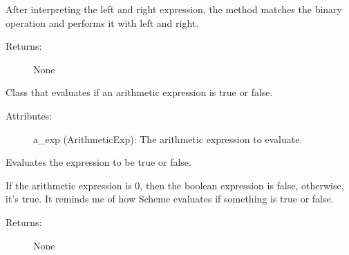 \documentclass[letterpaper,10pt,english]{sphinxmanual}
\begin{document}
\begin{fulllineitems}
\begin{fulllineitems}
\sphinxAtStartPar
After interpreting the left and right expression, the method matches
the binary operation and performs it with left and right.
\begin{description}
\item[{Returns:}] \leavevmode
\sphinxAtStartPar
None

\end{description}

\end{fulllineitems}


\end{fulllineitems}


\begin{fulllineitems}
\label{\detokenize{expressions:robol_lang.expressions.BoolExp}}
\sphinxAtStartPar
Class that evaluates if an arithmetic expression is true or false.
\begin{description}
\item[{Attributes:}] \leavevmode
\sphinxAtStartPar
a\_exp (ArithmeticExp): The arithmetic expression to evaluate.

\end{description}

\begin{fulllineitems}
\label{\detokenize{expressions:robol_lang.expressions.BoolExp.interpret}}
\sphinxAtStartPar
Evaluates the expression to be true or false.

\sphinxAtStartPar
If the arithmetic expression is 0, then the boolean expression is false,
otherwise, it’s true. It reminds me of how Scheme evaluates if something
is true or false.
\begin{description}
\item[{Returns:}] \leavevmode
\sphinxAtStartPar
None

\end{description}

\end{fulllineitems}


\end{fulllineitems}
\end{document}
